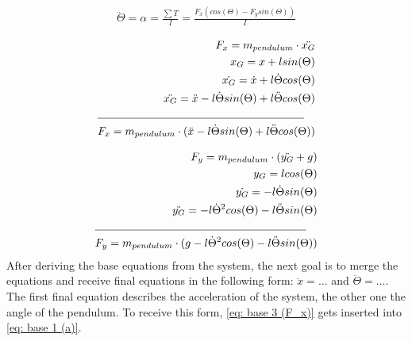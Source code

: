     \begin{align}    \label{eq: base 2 (alpha)}
            \ddot{\Theta} = \alpha = \frac{\sum T}{I} = \frac{F_x(cos(\Theta)-F_y sin(\Theta))}{I}
    \end{align}

    \begin{align}   \label{eq: base 3 (F_x)}
        F_x = m_{pendulum} \cdot \ddot{x_G} \notag\\
        x_G = x + l sin(\Theta)\notag \\
        \dot{x_G} = \dot{x} + l \dot{\Theta} cos(\Theta)\notag \\
        \ddot{x_G} = \ddot{x} - l \dot{\Theta} sin(\Theta) + l \ddot{\Theta} cos(\Theta)\notag \\ \cline{1-2}
        F_x = m_{pendulum}\cdot(\ddot{x} - l \dot{\Theta} sin(\Theta) + l \ddot{\Theta} cos(\Theta))
    \end{align}
 
    \begin{align}   \label{eq: base 4 (F_y)}
        F_y = m_{pendulum} \cdot (\ddot{y_G} + g)\notag \\
        y_G = l  cos(\Theta)\notag \\
        \dot{y_G} = -l  \dot{\Theta}  sin(\Theta)\notag \\
        \ddot{y_G} = -l \dot{\Theta}^2  cos(\Theta) - l \ddot{\Theta} sin(\Theta)\notag \\\cline{1-2}
        F_y = m_{pendulum} \cdot (g - l \dot{\Theta}^2  cos(\Theta) - l \ddot{\Theta} sin(\Theta))
    \end{align}
    After deriving the base equations from the system, the next goal is to merge the equations and receive final equations in the following form: $\ddot{x} = \dots$ and $\ddot{\Theta} = \dots$. The first final equation describes the acceleration of the system, the other one the angle of the pendulum. To receive this form, \autoref{eq: base 3 (F_x)} gets inserted into \autoref{eq: base 1 (a)}.
    
